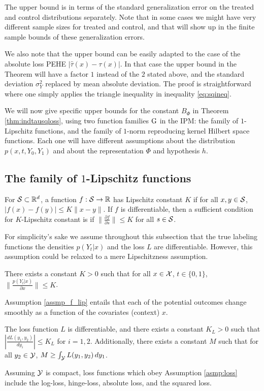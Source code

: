 The upper bound is in terms of the standard generalization error on the treated and control distributions separately. Note that in some cases we might have very different sample sizes for treated and control, and that will show up in the finite sample bounds of these generalization errors.

We also note that the upper bound can be easily adapted to the case of the absolute loss PEHE $\left| \hat{\tau}(x) - \tau(x)\right|$. In that case the upper bound in the Theorem will have a factor $1$ instead of the $2$ stated above, and the standard deviation $\sigma^2_Y$ replaced by mean absolute deviation. The proof is straightforward where one simply applies the triangle inequality in inequality \eqref{eq:sqineq}.


We will now give specific upper bounds for the constant $B_\Phi$ in Theorem \ref{thm:indtausqloss}, using two function families $\mathrm{G}$ in the IPM: the family of $1$-Lipschitz functions, and the family of $1$-norm reproducing kernel Hilbert space functions. Each one will have different assumptions about the distribution $p(x,t,Y_0,Y_1)$ and about the representation $\Phi$ and hypothesis $h$.

\subsection{The family of $1$-Lipschitz functions}\label{subsec:wass}

For $\mathcal S \subset \mathbb{R}^d$, a function $f : \mathcal S \rightarrow \mathbb{R}$ has Lipschitz constant $K$ if for all $x,y \in \mathcal S$, $|f(x) - f(y)| \leq K\|x-y\|$. If $f$ is differentiable, then a sufficient condition for $K$-Lipschitz constant is if $\| \frac{\partial f}{\partial s} \| \leq K$ for all $s\in \mathcal S$.

For simplicity's sake we assume throughout this subsection that the true labeling functions the densities $p(Y_t|x)$ and the loss $L$ are differentiable. However, this assumption could be relaxed to a mere Lipschitzness assumption.
\begin{thmappasmp}\label{assmp_f_lip}
There exists a constant $K >0$ such that for all $x \in \mathcal X$, $t \in \{0,1\}$, $\| \frac{p(Y_t|x)}{\partial x} \| \leq K$.
\end{thmappasmp}
Assumption \ref{assmp_f_lip} entails that each of the potential outcomes change smoothly as a function of the covariates (context) $x$.

\begin{thmappasmp}\label{asmp:loss}
The loss function $L$ is differentiable, and there exists a constant $K_L >0$ such that $\left|\frac{d L(y_1,y_2)}{d y_i}\right| \leq K_L$ for $i=1,2$. Additionally, there exists a constant $M$ such that for all $y_2\in \mathcal Y$, $M \geq \int_{\mathcal Y} L(y_1,y_2)\, dy_1$.
\end{thmappasmp}
Assuming $\mathcal Y$ is compact, loss functions which obey Assumption \ref{asmp:loss} include the log-loss, hinge-loss, absolute loss, and the squared loss.

